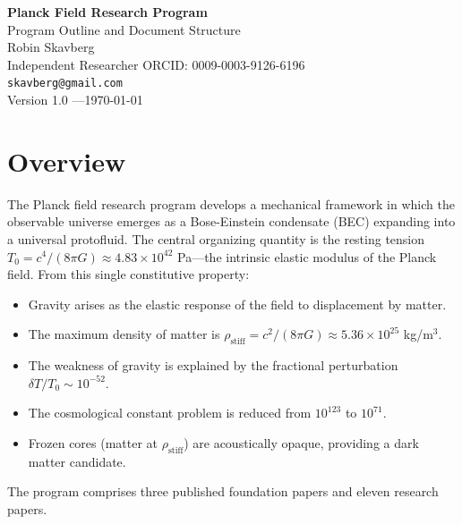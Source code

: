 \documentclass[11pt,a4paper]{article}
\newcommand{\rhostiff}{\ensuremath{\rho_{\mathrm{stiff}}}}
\newcommand{\Tzero}{\ensuremath{T_0}}
\begin{document}
\begin{center}
{\LARGE \textbf{Planck Field Research Program}}\\[0.5em]
{\Large Program Outline and Document Structure}\\[1.5em]
{\large Robin Skavberg}\\[0.3em]
{\small Independent Researcher \quad ORCID: 0009-0003-9126-6196}\\
{\small \texttt{skavberg@gmail.com}}\\[1.5em]
{\small Version 1.0 \quad---\quad \today}
\end{center}

\vspace{1em}

\tableofcontents
\newpage

\section{Overview}

The Planck field research program develops a mechanical framework in which the observable universe emerges as a Bose-Einstein condensate (BEC) expanding into a universal protofluid. The central organizing quantity is the resting tension $\Tzero = c^4/(8\pi G) \approx 4.83 \times 10^{42}$ Pa---the intrinsic elastic modulus of the Planck field. From this single constitutive property:

\begin{itemize}[leftmargin=*, itemsep=0.3em]
\item Gravity arises as the elastic response of the field to displacement by matter.
\item The maximum density of matter is $\rhostiff = c^2/(8\pi G) \approx 5.36 \times 10^{25}$ kg/m$^3$.
\item The weakness of gravity is explained by the fractional perturbation $\delta T/\Tzero \sim 10^{-52}$.
\item The cosmological constant problem is reduced from $10^{123}$ to $10^{71}$.
\item Frozen cores (matter at $\rhostiff$) are acoustically opaque, providing a dark matter candidate.
\end{itemize}

The program comprises three published foundation papers and eleven research papers.
\end{document}
